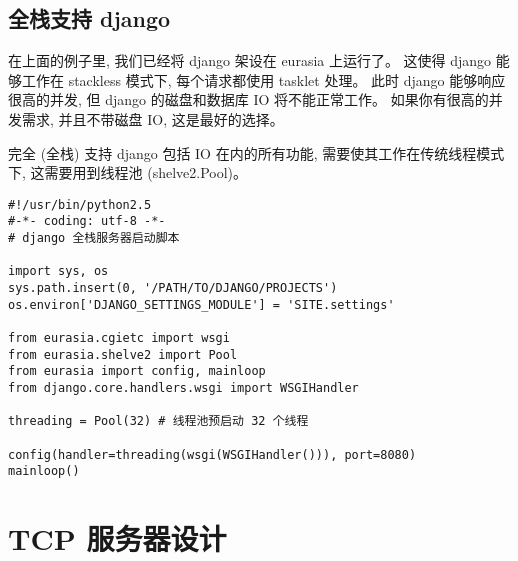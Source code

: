 \documentclass{manual}
\begin{document}



\subsection{全栈支持 django}

在上面的例子里, 我们已经将 django 架设在 eurasia 上运行了。
这使得 django 能够工作在 stackless 模式下, 每个请求都使用 tasklet 处理。
此时 django 能够响应很高的并发, 但 django 的磁盘和数据库 IO 将不能正常工作。
如果你有很高的并发需求, 并且不带磁盘 IO, 这是最好的选择。

完全 (全栈) 支持 django 包括 IO 在内的所有功能, 需要使其工作在传统线程模式下,
这需要用到线程池 (shelve2.Pool)。

\begin{verbatim}
#!/usr/bin/python2.5
#-*- coding: utf-8 -*-
# django 全栈服务器启动脚本

import sys, os
sys.path.insert(0, '/PATH/TO/DJANGO/PROJECTS')
os.environ['DJANGO_SETTINGS_MODULE'] = 'SITE.settings'

from eurasia.cgietc import wsgi
from eurasia.shelve2 import Pool
from eurasia import config, mainloop
from django.core.handlers.wsgi import WSGIHandler

threading = Pool(32) # 线程池预启动 32 个线程

config(handler=threading(wsgi(WSGIHandler())), port=8080)
mainloop() 
\end{verbatim}

\section{TCP 服务器设计}
\end{document}
